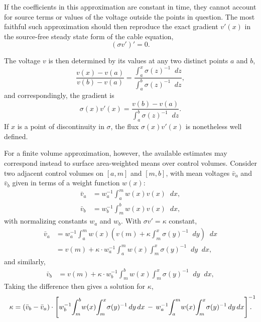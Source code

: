 \documentclass[parskip=half]{scrartcl}
\newcommand{\Int}[2]{\int_{#1}^{#2}\!}
\newcommand{\D}{\mathop{}\!d}
\theoremstyle{nonumberplain}
\begin{document}
If the coefficients in this approximation are constant in
time, they cannot account for source terms or values of the
voltage outside the points in question. The most faithful
such approximation should then reproduce the exact gradient $v'(x)$
in the source-free steady state form of the cable equation,
\begin{equation}
    (\sigma v')' = 0.
\end{equation}

The voltage $v$ is then determined by its values at
any two distinct points $a$ and $b$,
\begin{equation}
    \frac{v(x) - v(a)}{v(b) - v(a)} =
    \frac{\displaystyle \Int{a}{x} \sigma(z)^{-1} \D z}
         {\displaystyle \Int{a}{b} \sigma(z)^{-1} \D z},
\end{equation}
and correspondingly, the gradient is
\begin{equation}
    \sigma(x) v'(x) =
    \frac{v(b) - v(a)}
         {\displaystyle\Int{a}{b} \sigma(z)^{-1} \D z}.
\end{equation}
If $x$ is a point of discontinuity in $\sigma$,
the flux $\sigma(x)v'(x)$ is nonetheless well defined.

For a finite volume approximation, however, the available
estimates may correspond instead to surface area-weighted means
over control volumes. Consider two adjacent control volumes
on $[a, m]$ and $[m, b]$, with mean voltages $\bar v_a$ and
$\bar v_b$ given in terms of a weight function $w(x)$:
\begin{align}
    \bar v_a &= w_a^{-1} \Int{a}{m} w(x)v(x) \D x,\\
    \bar v_b &= w_b^{-1} \Int{m}{b} w(x)v(x) \D x,
\end{align}
with normalizing constants $w_a$ and $w_b$. With $\sigma v' = \kappa$
constant,
\begin{equation}
    \begin{aligned}
        \bar v_a
        &= w_a^{-1} \Int{a}{m} w(x) \left( v(m) + \kappa \Int{m}{x} \sigma(y)^{-1} \D y \right) \D x \\
        &= v(m) + \kappa \cdot w_a^{-1} \Int{a}{m} w(x) \Int{m}{x} \sigma(y)^{-1} \D y \D x,
    \end{aligned}
\end{equation}
and similarly, 
\begin{equation}
    \begin{aligned}
        \bar v_b
        &= v(m) + \kappa \cdot w_b^{-1} \Int{m}{b} w(x) \Int{m}{x} \sigma(y)^{-1} \D y \D x,
    \end{aligned}
\end{equation}
Taking the difference then gives a solution for $\kappa$,
\begin{equation}
    \kappa = (\bar v_b - \bar v_a) \cdot \left[
        w_b^{-1}\!\Int{m}{b} w(x)\! \Int{m}{x} \sigma(y)^{-1} \D y \D x\,-\,
        w_a^{-1}\!\Int{a}{m} w(x)\! \Int{m}{x} \sigma(y)^{-1} \D y \D x
        \right]^{\mathrlap{-1}}.
\end{equation}
\end{document}
